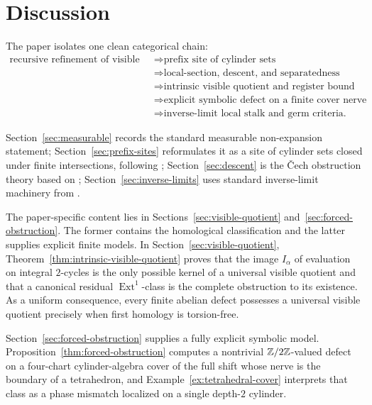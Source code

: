 \section{Discussion}

The paper isolates one clean categorical chain:
\[
\begin{aligned}
\text{recursive refinement of visible events}
&\Longrightarrow \text{prefix site of cylinder sets} \\
&\Longrightarrow \text{local-section, descent, and separatedness obstructions} \\
&\Longrightarrow \text{intrinsic visible quotient and register bound} \\
&\Longrightarrow \text{explicit symbolic defect on a finite cover nerve} \\
&\Longrightarrow \text{inverse-limit local stalk and germ criteria.}
\end{aligned}
\]

Section~\ref{sec:measurable} records the standard measurable non-expansion
statement; Section~\ref{sec:prefix-sites} reformulates it as a site of cylinder
sets closed under finite intersections, following
\cite{MacLaneMoerdijk1992,Johnstone2002Elephant,SGA4I}; Section~\ref{sec:descent}
is the \v{C}ech obstruction theory based on
\cite{StacksProject,Giraud1971CohomologieNonAbelienne,Bredon1997SheafTheory};
Section~\ref{sec:inverse-limits} uses standard inverse-limit machinery from
\cite{RibesZalesskii2010ProfiniteGroups,Wilson1998ProfiniteGroups}.

The paper-specific content lies in Sections~\ref{sec:visible-quotient}
and~\ref{sec:forced-obstruction}.  The former contains the homological
classification and the latter supplies explicit finite models.  In
Section~\ref{sec:visible-quotient}, Theorem~\ref{thm:intrinsic-visible-quotient}
proves that the image $I_\alpha$ of evaluation on integral $2$-cycles is the
only possible kernel of a universal visible quotient and that a canonical
residual $\operatorname{Ext}^1$-class is the complete obstruction to its
existence.  As a uniform consequence, every finite abelian defect possesses a
universal visible quotient precisely when first homology is torsion-free.

Section~\ref{sec:forced-obstruction} supplies a fully explicit symbolic model.
Proposition~\ref{thm:forced-obstruction} computes a nontrivial $\mathbb{Z}/2\mathbb{Z}$-valued
defect on a four-chart cylinder-algebra cover of the full shift whose nerve is the
boundary of a tetrahedron, and Example~\ref{ex:tetrahedral-cover} interprets
that class as a phase mismatch localized on a single depth-$2$ cylinder.

